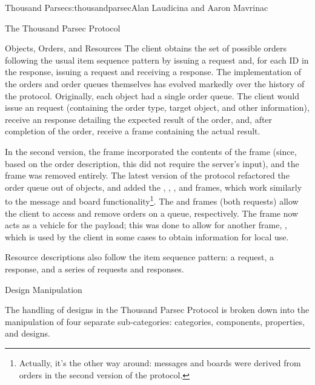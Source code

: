 \begin{aosachapter}{Thousand Parsec}{s:thousandparsec}{Alan Laudicina and Aaron Mavrinac}
\begin{aosasect1}{The Thousand Parsec Protocol}
\begin{aosasect2}{Objects, Orders, and Resources}
The client obtains the set of possible orders following the usual item
sequence pattern by issuing a  request
and, for each ID in the  response,
issuing a  request and receiving a
 response. The implementation of the orders
and order queues themselves has evolved markedly over the history of
the protocol. Originally, each object had a single order queue. The
client would issue an  request (containing the order type,
target object, and other information), receive an 
response detailing the expected result of the order, and, after
completion of the order, receive a  frame containing the
actual result.

In the second version, the  frame incorporated the
contents of the  frame (since, based on the order
description, this did not require the server's input), and the
 frame was removed entirely. The latest version of the
protocol refactored the order queue out of objects, and added the
, , , and  frames, which work similarly to
the message and board functionality\footnote{Actually, it's the other
way around: messages and boards were derived from orders in the
second version of the protocol.}.  The  and
 frames (both  requests) allow
the client to access and remove orders on a queue, respectively. The
 frame now acts as a vehicle for the 
payload; this was done to allow for another frame, ,
which is used by the client in some cases to obtain information for
local use.

Resource descriptions also follow the item sequence pattern: a
 request, a  response, and a series of  requests and  responses.

\end{aosasect2}

\begin{aosasect2}{Design Manipulation}

The handling of designs in the Thousand Parsec Protocol is broken down
into the manipulation of four separate sub-categories: categories,
components, properties, and designs.


\end{aosasect2}
\end{aosasect1}
\end{aosachapter}
